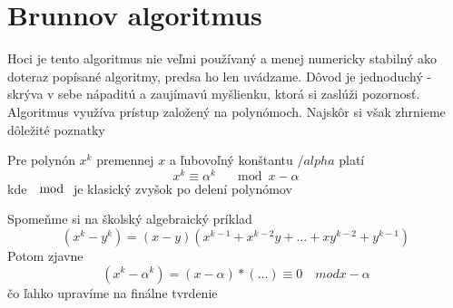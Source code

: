 \section{Brunnov algoritmus}

Hoci je tento algoritmus nie veľmi používaný a menej numericky
stabilný ako doteraz popísané algoritmy, predsa ho len uvádzame.
Dôvod je jednoduchý - skrýva v sebe nápaditú a zaujímavú myšlienku,
ktorá si zaslúži pozornosť. Algoritmus využíva prístup založený na
polynómoch. Najskôr si však zhrnieme dôležité poznatky

\begin{lema}
    Pre polynón $x^k$ premennej $x$ a ľubovoľný konštantu $/alpha$
    platí
    \begin{equation}
        x^k \equiv \alpha^k \quad \mod x-\alpha
    \end{equation}
    kde $\mod$ je klasický zvyšok po delení polynómov
    \label{lema:polymod}
\end{lema}
\begin{dokaz}
    Spomeňme si na školský algebraický príklad
    \begin{equation}
        (x^k - y^k) = (x - y) (x^{k-1} + x^{k-2} y + \dots 
            + x y^{k-2} + y^{k-1})
    \end{equation}
    Potom zjavne
    \begin{equation}
        (x^k - \alpha^k) = (x - \alpha) * (\dots) \equiv 0 
        \quad mod x-\alpha
    \end{equation}
    čo ľahko upravíme na finálne tvrdenie
\end{dokaz}

